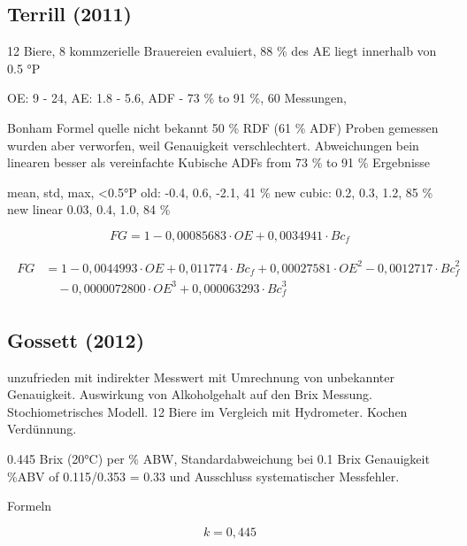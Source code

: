 \documentclass[a4paper,parskip=half]{scrartcl}
\newcommand{\bxic}{\mathit{OE}}
\newcommand{\bxfc}{\mathit{Bc}_f}
\newcommand{\fg}{\mathit{FG}}
\begin{document}
\subsection*{Terrill (2011)}

12 Biere, 8 kommzerielle Brauereien evaluiert, 88 \% des AE liegt innerhalb
von 0.5 °P
\autocite{Terrill2013}

OE: 9 - 24, AE: 1.8 - 5.6, ADF - 73 \% to 91 \%, 60 Messungen,
\autocite{Terrill2010}


Bonham Formel quelle nicht bekannt
50 \% RDF (61 \% ADF) Proben gemessen wurden aber verworfen, weil
Genauigkeit verschlechtert.
Abweichungen bein linearen besser als vereinfachte Kubische
ADFs from 73 \% to 91 \% Ergebnisse
\autocite{Terrill2011}

mean, std, max, <0.5°P
old: -0.4, 0.6, -2.1, 41 \%
new cubic: 0.2, 0.3, 1.2, 85 \%
new linear 0.03, 0.4, 1.0, 84 \%

\autocite{Terrill2011}


\begin{equation}
\fg = 1 - 0,00085683 \cdot \bxic + 0,0034941 \cdot \bxfc
\label{eq:terrilllinear} 
\end{equation}

\begin{align}
\begin{split}
\fg &= 1 - 0,0044993 \cdot \bxic + 0,011774 \cdot \bxfc + 0,00027581 \cdot \bxic^2 - 0,0012717 \cdot \bxfc^2 \\
& \quad  - 0,0000072800 \cdot \bxic^3  + 0,000063293 \cdot \bxfc^3
\end{split} \label{eq:terrillcubic} 
\end{align}

\subsection*{Gossett (2012)}

unzufrieden mit indirekter Messwert mit Umrechnung von
unbekannter Genauigkeit.
Auswirkung von Alkoholgehalt auf den Brix Messung.
Stochiometrisches Modell. 12 Biere im Vergleich mit
Hydrometer. Kochen Verdünnung.
\autocite{Gossett2012}

0.445 Brix (20°C) per \% ABW, 
Standardabweichung bei 0.1 Brix Genauigkeit  \%ABV of 0.115/0.353 = 0.33
und Ausschluss systematischer Messfehler.
\autocite{Gossett2012a}

Formeln
\autocite{Gossett2012b}

\begin{equation}
k = 0,445
\end{equation}
\end{document}
